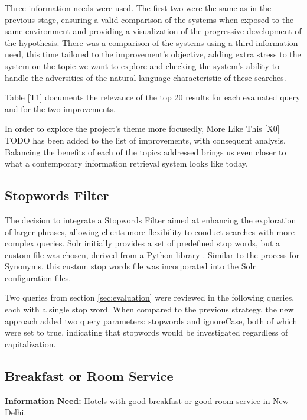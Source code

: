 \documentclass[sigconf]{acmart}
\begin{document}
Three information needs were used. The first two were the same as in the previous stage, ensuring a valid comparison of the systems when exposed to the same environment and providing a visualization of the progressive development of the hypothesis. There was a comparison of the systems using a third information need, this time tailored to the improvement's objective, adding extra stress to the system on the topic we want to explore and checking the system's ability to handle the adversities of the natural language characteristic of these searches.

Table [T1] documents the relevance of the top 20 results for each evaluated query and for the two improvements.

In order to explore the project's theme more focusedly, More Like This [X0] TODO has been added to the list of improvements, with consequent analysis. Balancing the benefits of each of the topics addressed brings us even closer to what a contemporary information retrieval system looks like today.

\subsection{Stopwords Filter}

The decision to integrate a Stopwords Filter aimed at enhancing the exploration of larger phrases, allowing clients more flexibility to conduct searches with more complex queries. Solr initially provides a set of predefined stop words, but a custom file was chosen, derived from a Python library \cite{NLTK}. Similar to the process for Synonyms, this custom stop words file was incorporated into the Solr configuration files.

Two queries from section \ref{sec:evaluation} were reviewed in the following queries, each with a single stop word. When compared to the previous strategy, the new approach added two query parameters: stopwords and ignoreCase, both of which were set to true, indicating that stopwords would be investigated regardless of capitalization.

\renewcommand{\thesubsection}{\Alph{subsection}}

\setcounter{subsection}{0}
\subsection{Breakfast or Room Service}

\textbf{Information Need:} Hotels with good breakfast or good room service in New Delhi.
\end{document}
